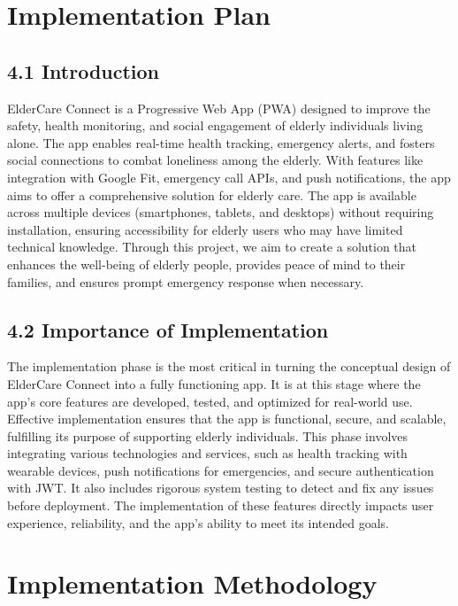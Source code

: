 \documentclass[a4paper, 12pt]{article}
\begin{document}
\newpage
\section{\textbf{\LARGE Implementation Plan}}

\subsection{\textbf{\Large 4.1 Introduction}}
ElderCare Connect is a Progressive Web App (PWA) designed to improve the safety, health monitoring, and social engagement of elderly individuals living alone. The app enables real-time health tracking, emergency alerts, and fosters social connections to combat loneliness among the elderly. With features like integration with Google Fit, emergency call APIs, and push notifications, the app aims to offer a comprehensive solution for elderly care.  
The app is available across multiple devices (smartphones, tablets, and desktops) without requiring installation, ensuring accessibility for elderly users who may have limited technical knowledge. Through this project, we aim to create a solution that enhances the well-being of elderly people, provides peace of mind to their families, and ensures prompt emergency response when necessary.

\subsection{\textbf{\Large 4.2 Importance of Implementation}}
The implementation phase is the most critical in turning the conceptual design of ElderCare Connect into a fully functioning app. It is at this stage where the app's core features are developed, tested, and optimized for real-world use. Effective implementation ensures that the app is functional, secure, and scalable, fulfilling its purpose of supporting elderly individuals.  
This phase involves integrating various technologies and services, such as health tracking with wearable devices, push notifications for emergencies, and secure authentication with JWT. It also includes rigorous system testing to detect and fix any issues before deployment. The implementation of these features directly impacts user experience, reliability, and the app's ability to meet its intended goals.

\section{\textbf{\LARGE Implementation Methodology}}
\end{document}

